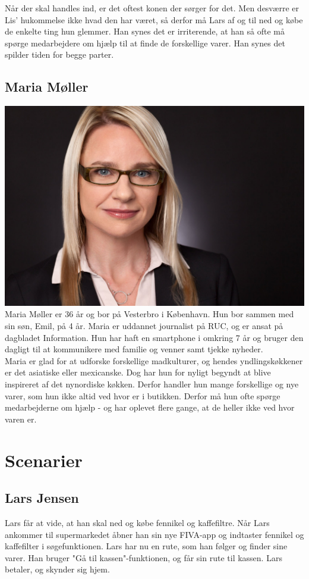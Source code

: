 \documentclass[12pt]{article}
\begin{document}
\noindent Når der skal handles ind, er det oftest konen der sørger for det. Men desværre er Lis' hukommelse ikke hvad den har været, så derfor må Lars af og til ned og købe de enkelte ting hun glemmer. Han synes det er irriterende, at han så ofte må spørge medarbejdere om hjælp til at finde de forskellige varer. Han synes det spilder tiden for begge parter.

\subsection{Maria Møller}

\includegraphics[scale=0.2]{includes/maria.jpg}
\noindent Maria Møller er 36 år og bor på Vesterbro i København. Hun bor sammen med sin søn, Emil, på 4 år. Maria er uddannet journalist på RUC, og er ansat på dagbladet Information. Hun har haft en smartphone i omkring 7 år og bruger den dagligt til at kommunikere med familie og venner samt tjekke nyheder.\\

\noindent Maria er glad for at udforske forskellige madkulturer, og hendes yndlingskøkkener er det asiatiske eller mexicanske. Dog har hun for nyligt begyndt at blive inspireret af det nynordiske køkken. Derfor handler hun mange forskellige og nye varer, som hun ikke altid ved hvor er i butikken. Derfor må hun ofte spørge medarbejderne om hjælp - og har oplevet flere gange, at de heller ikke ved hvor varen er.


\section{Scenarier}

\subsection{Lars Jensen}
Lars får at vide, at han skal ned og købe fennikel og kaffefiltre. Når Lars ankommer til supermarkedet åbner han sin nye FIVA-app og indtaster fennikel og kaffefilter i søgefunktionen. Lars har nu en rute, som han følger og finder sine varer. Han bruger "Gå til kassen"-funktionen, og får sin rute til kassen. Lars betaler, og skynder sig hjem.
\end{document}
